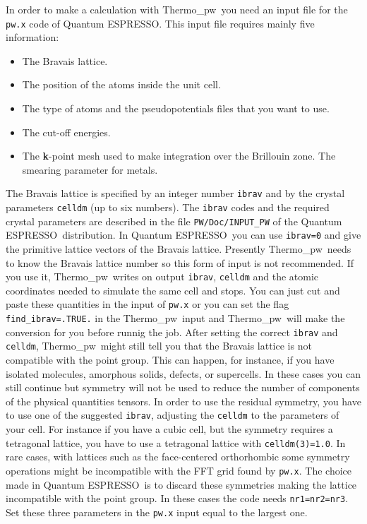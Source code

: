 \documentclass[12pt,a4paper,twoside]{report}
\def\qe{{\sc Quantum ESPRESSO}}
\def\thermo{{\sc Thermo}\_{\sc pw}}
\begin{document}
In order to make a calculation with \thermo\ you need  
an input file for the \texttt{pw.x} code of \qe. This input file
requires mainly five information:
\begin{itemize}
\item The Bravais lattice.

\item The position of the atoms inside the unit cell.

\item The type of atoms and the pseudopotentials files that you want to use.

\item The cut-off energies.

\item The {\bf k}-point mesh used to make integration over
the Brillouin zone. The smearing parameter for metals. 
\end{itemize}

The Bravais lattice is specified by an integer number \texttt{ibrav} and by the
crystal parameters \texttt{celldm} (up to six numbers).  
The \texttt{ibrav} codes and the required crystal parameters 
are described in the file \texttt{PW/Doc/INPUT\_PW} of the 
\qe\ distribution. 
In \qe\ you can use \texttt{ibrav=0} and give the primitive
lattice vectors of the Bravais lattice. Presently \thermo\ needs to
know the Bravais lattice number so this form of input is not recommended. 
If you use it, \thermo\ writes on output \texttt{ibrav}, 
\texttt{celldm} and the atomic coordinates needed to simulate
the same cell and stops.
You can just cut and paste these quantities in the input of \texttt{pw.x}
or you can set the flag \texttt{find\_ibrav=.TRUE.} in the \thermo\ input
and \thermo\ will make the conversion for you before runnig the job. 
After setting the correct
\texttt{ibrav} and \texttt{celldm}, \thermo\ might still tell you
that the Bravais lattice is not compatible with the point group. This
can happen, for instance, if you have isolated molecules, amorphous solids,
defects, or supercells. In these cases you can still continue but symmetry 
will not be 
used to reduce the number of components of the physical quantities tensors. 
In order to use the residual symmetry, you have to
use one of the suggested \texttt{ibrav}, adjusting the \texttt{celldm} to
the parameters of your cell. For instance if you have a cubic cell, but
the symmetry requires a tetragonal lattice, you have to use a tetragonal
lattice with \texttt{celldm(3)=1.0}.
In rare cases, with lattices such as the face-centered orthorhombic some
symmetry operations might be incompatible with the FFT grid found by 
\texttt{pw.x}. The choice made in \qe\ is to discard these symmetries making
the lattice incompatible with the point group. In these cases the code needs 
\texttt{nr1=nr2=nr3}. Set these three parameters in the \texttt{pw.x} input 
equal to the largest one. 
\end{document}
